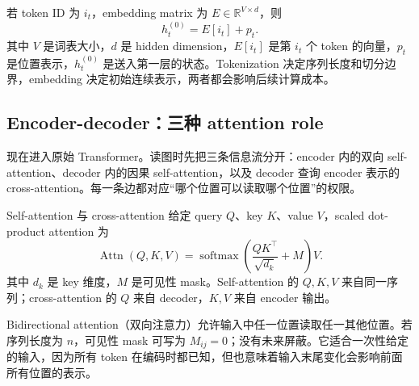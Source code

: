 

若 token ID 为 $i_t$，embedding matrix 为 $E\in\mathbb{R}^{V\times d}$，则
\[
h_t^{(0)}=E[i_t]+p_t.
\]
其中 $V$ 是词表大小，$d$ 是 hidden dimension，$E[i_t]$ 是第 $i_t$ 个 token 的向量，$p_t$ 是位置表示，$h_t^{(0)}$ 是送入第一层的状态。Tokenization 决定序列长度和切分边界，embedding 决定初始连续表示，两者都会影响后续计算成本。


\subsection{Encoder-decoder：三种 attention role}

现在进入原始 Transformer。读图时先把三条信息流分开：encoder 内的双向 self-attention、decoder 内的因果 self-attention，以及 decoder 查询 encoder 表示的 cross-attention。每一条边都对应“哪个位置可以读取哪个位置”的权限。


\begin{importantbox}{Self-attention 与 cross-attention}
给定 query $Q$、key $K$、value $V$，scaled dot-product attention 为
\[
\operatorname{Attn}(Q,K,V)=\operatorname{softmax}\!\left(\frac{QK^{\top}}{\sqrt{d_k}}+M\right)V.
\]
其中 $d_k$ 是 key 维度，$M$ 是可见性 mask。Self-attention 的 $Q,K,V$ 来自同一序列；cross-attention 的 $Q$ 来自 decoder，$K,V$ 来自 encoder 输出。
\end{importantbox}


Bidirectional attention（双向注意力）允许输入中任一位置读取任一其他位置。若序列长度为 $n$，可见性 mask 可写为 $M_{ij}=0$；没有未来屏蔽。它适合一次性给定的输入，因为所有 token 在编码时都已知，但也意味着输入末尾变化会影响前面所有位置的表示。


